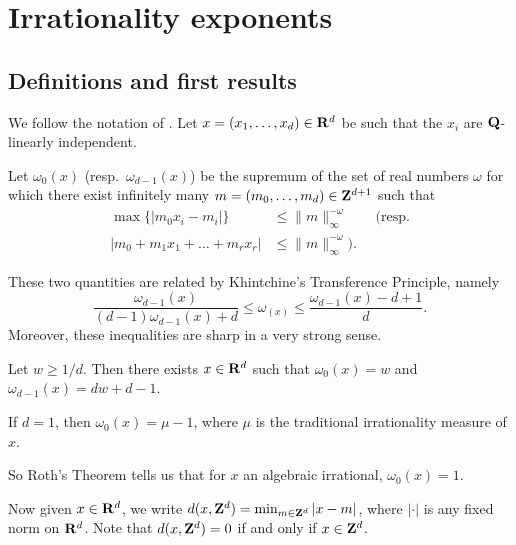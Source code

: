 
\chapter{Irrationality exponents}\label{chapter:irrationality-exponent}





\section{Definitions and first results}

We follow the notation of \cite{laurent-2009}. Let 
$x=(x_1,\dots,x_d)\in \mathbf{R}^d$ be such that the $x_i$ are $\mathbf{Q}$-linearly 
independent. 

\begin{definition}\label{def:approx-exp}
Let $\omega_0(x)$ (resp.~$\omega_{d-1}(x)$) be the supremum of the set of real 
numbers $\omega$ for which there exist infinitely many 
$m=(m_0,\dots,m_d)\in \mathbf{Z}^{d+1}$ such that 
\begin{align*}
	\max\{|m_0 x_i - m_i|\} 
		&\leqslant \|m\|_\infty^{-\omega}  \qquad\text{(resp.} \\
	|m_0 + m_1 x_1 + \dots + m_r x_r| 
		&\leqslant \|m\|_\infty^{-\omega} \text{).}
\end{align*}
\end{definition}

These two quantities are related by Khintchine's Transference Principle, namely 
\[
	\frac{\omega_{d-1}(x)}{(d-1) \omega_{d-1}(x)+d} \leqslant \omega_(x) \leqslant \frac{\omega_{d-1}(x)-d+1}{d} .
\]
Moreover, these inequalities are sharp in a very strong sense. 

\begin{theorem}[Jarn\'ik]\label{thm:jarnik}
Let $w\geqslant 1/d$. Then there exists $x\in \mathbf{R}^d$ such that $\omega_0(x)=w$ 
and $\omega_{d-1}(x) = d w+d-1$. 
\end{theorem}

\begin{theorem}
If $d=1$, then $\omega_0(x) = \mu-1$, where $\mu$ is the traditional 
irrationality measure of $x$. 
\end{theorem}

So Roth's Theorem tells us that for $x$ an algebraic irrational, 
$\omega_0(x) = 1$. 

Now given $x\in \mathbf{R}^d$, we write $d(x,\mathbf{Z}^d)=\min_{m\in \mathbf{Z}^d} |x-m|$, where 
$|\cdot|$ is any fixed norm on $\mathbf{R}^d$. Note that $d(x,\mathbf{Z}^d)=0$ if and only if 
$x\in \mathbf{Z}^d$. 

